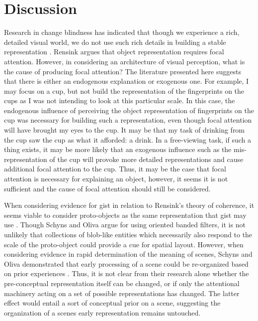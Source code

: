 \documentclass[a4paper,10pt,final]{ThesisStyle}
\begin{document}


\section{Discussion}

Research in change blindness has indicated that though we experience a rich, detailed visual world, we do not use such rich details in building a stable representation \cite{Simons1997}.  Rensink argues that object representation requires focal attention.  However, in considering an architecture of visual perception, what is the cause of producing focal attention?  The literature presented here suggests that there is either an endogenous explanation or exogenous one.  For example, I may focus on a cup, but not build the representation of the fingerprints on the cups as I was not intending to look at this particular scale.  In this case, the endogenous influence of perceiving the object representation of fingerprints on the cup was necessary for building such a representation, even though focal attention will have brought my eyes to the cup.  It may be that my task of drinking from the cup saw the cup as what it afforded: a drink.  In a free-viewing task, if such a thing exists, it may be more likely that an exogenous influence such as the mis-representation of the cup will provoke more detailed representations and cause additional focal attention to the cup.  Thus, it may be the case that focal attention is necessary for explaining an object, however, it seems it is not sufficient and the cause of focal attention should still be considered.  

When considering evidence for gist in relation to Rensink's theory of coherence, it seems viable to consider proto-objects as the same representation that gist may use \cite{Rensink2002}.  Though Schyns and Oliva argue for using oriented banded filters, it is not unlikely that collections of blob-like entities which necessarily also respond to the scale of the proto-object could provide a cue for spatial layout.   However, when considering evidence in rapid determination of the meaning of scenes, Schyns and Oliva demonstrated that early processing of a scene could be re-organized based on prior experiences \cite{Schyns1994,Oliva1997}.  Thus, it is not clear from their research alone whether the pre-conceptual representation itself can be changed, or if only the attentional machinery acting on a set of possible representations has changed.  The latter effect would entail a sort of conceptual prior on a scene, suggesting the organization of a scenes early representation remains untouched.
\end{document}
